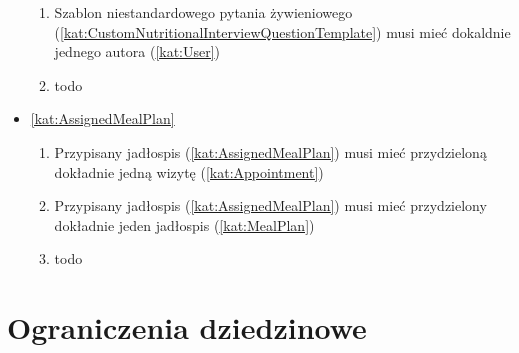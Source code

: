 \begin{itemize}[label={\textbf{Reguły dla}}, wide, labelwidth=!, labelindent=0pt]
\begin{enumerate}[label={\textbf{REG/\protect\threedigits{\arabic{enumi}}}}, wide, labelwidth=!, align=left, leftmargin=3cm, resume]
        \item Szablon niestandardowego pytania żywieniowego (\ref{kat:CustomNutritionalInterviewQuestionTemplate}) musi mieć dokaldnie jednego autora (\ref{kat:User})
        \item todo
    \end{enumerate}
    \item\ref{kat:AssignedMealPlan}
    \begin{enumerate}[label={\textbf{REG/\protect\threedigits{\arabic{enumi}}}}, wide, labelwidth=!, align=left, leftmargin=3cm, resume]
        \item Przypisany jadłospis (\ref{kat:AssignedMealPlan}) musi mieć przydzieloną dokładnie jedną wizytę (\ref{kat:Appointment})
        \item Przypisany jadłospis (\ref{kat:AssignedMealPlan}) musi mieć przydzielony dokładnie jeden jadłospis (\ref{kat:MealPlan})
        \item todo
    \end{enumerate}
\end{itemize}

\section{Ograniczenia dziedzinowe}\label{sec:restrictions}

